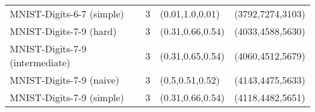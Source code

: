 \begin{tabular}{llll}
                       MNIST-Digits-6-7 (simple) &              3 &                                     (0.01,1.0,0.01) &                                               (3792,7274,3103) \\
                         MNIST-Digits-7-9 (hard) &              3 &                                    (0.31,0.66,0.54) &                                               (4033,4588,5630) \\
                 MNIST-Digits-7-9 (intermediate) &              3 &                                    (0.31,0.65,0.54) &                                               (4060,4512,5679) \\
                        MNIST-Digits-7-9 (naive) &              3 &                                     (0.5,0.51,0.52) &                                               (4143,4475,5633) \\
                       MNIST-Digits-7-9 (simple) &              3 &                                    (0.31,0.66,0.54) &                                               (4118,4482,5651) \\
\bottomrule
\end{tabular}
